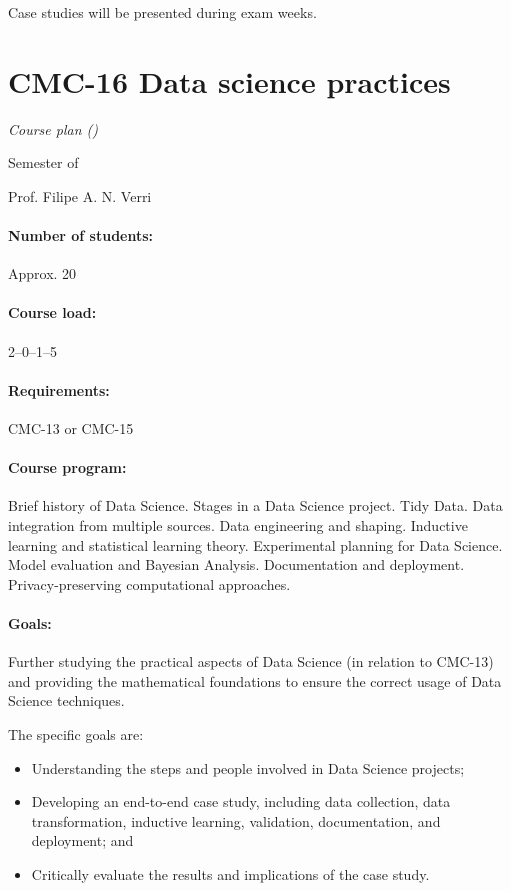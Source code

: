 Case studies will be presented during exam weeks.

\newpage
{}
\thispagestyle{empty}
\section*{CMC-16 Data science practices}

\emph{Course plan (\the\year{})}

 Semester of \the\year{}

Prof. Filipe A. N. Verri

\paragraph{Number of students:} Approx. 20

\paragraph{Course load:} 2--0--1--5

\paragraph{Requirements:} CMC-13 or CMC-15

\paragraph{Course program:}
Brief history of Data Science. Stages in a Data Science project. Tidy Data. Data
integration from multiple sources. Data engineering and shaping. Inductive learning and
statistical learning theory. Experimental planning for Data Science. Model evaluation and
Bayesian Analysis. Documentation and deployment. Privacy-preserving computational
approaches.

\paragraph{Goals:}
Further studying the practical aspects of Data Science (in relation to CMC-13) and providing
the mathematical foundations to ensure the correct usage of Data Science techniques.

The specific goals are:
\begin{itemize}
  \item Understanding the steps and people involved in Data Science projects;
  \item Developing an end-to-end case study, including data collection, data transformation,
    inductive learning, validation, documentation, and deployment; and
  \item Critically evaluate the results and implications of the case study.
\end{itemize}

